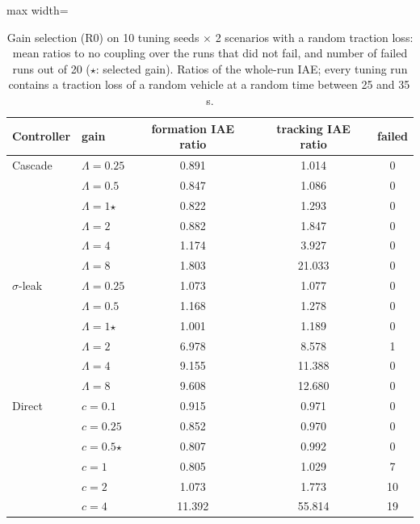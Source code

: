 \begin{table}[!t]\centering\footnotesize
\caption{Gain selection (R0) on 10 tuning seeds $\times$ 2 scenarios with a random traction loss: mean ratios to no coupling over the runs that did not fail, and number of failed runs out of 20 ($\star$: selected gain). Ratios of the whole-run IAE; every tuning run contains a traction loss of a random vehicle at a random time between 25 and 35\,s.}\label{tab:r0}
\begin{adjustbox}{max width=\columnwidth}
\begin{tabular}{@{}llccc@{}}\toprule
Controller & gain & formation IAE ratio & tracking IAE ratio & failed\\\midrule
Cascade & $\Lambda=0.25$ & 0.891 & 1.014 & 0\\
 & $\Lambda=0.5$ & 0.847 & 1.086 & 0\\
 & $\Lambda=1$$\star$ & 0.822 & 1.293 & 0\\
 & $\Lambda=2$ & 0.882 & 1.847 & 0\\
 & $\Lambda=4$ & 1.174 & 3.927 & 0\\
 & $\Lambda=8$ & 1.803 & 21.033 & 0\\
\addlinespace
$\sigma$-leak & $\Lambda=0.25$ & 1.073 & 1.077 & 0\\
 & $\Lambda=0.5$ & 1.168 & 1.278 & 0\\
 & $\Lambda=1$$\star$ & 1.001 & 1.189 & 0\\
 & $\Lambda=2$ & 6.978 & 8.578 & 1\\
 & $\Lambda=4$ & 9.155 & 11.388 & 0\\
 & $\Lambda=8$ & 9.608 & 12.680 & 0\\
\addlinespace
Direct & $c=0.1$ & 0.915 & 0.971 & 0\\
 & $c=0.25$ & 0.852 & 0.970 & 0\\
 & $c=0.5$$\star$ & 0.807 & 0.992 & 0\\
 & $c=1$ & 0.805 & 1.029 & 7\\
 & $c=2$ & 1.073 & 1.773 & 10\\
 & $c=4$ & 11.392 & 55.814 & 19\\
\bottomrule\end{tabular}
\end{adjustbox}
\end{table}
